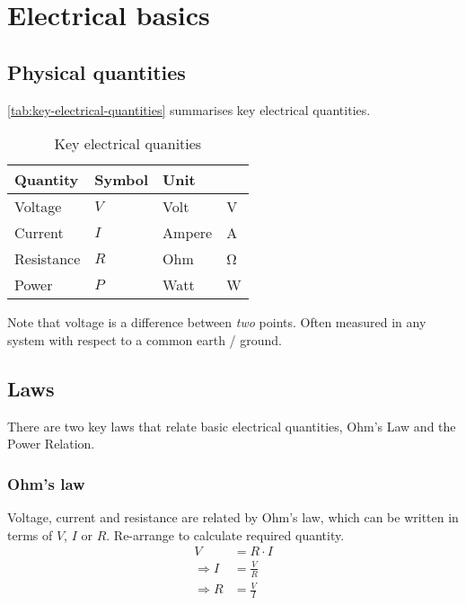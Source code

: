 \chapter{Electrical basics}
\label{ch:electrical-basics}


\section{Physical quantities}

\autoref{tab:key-electrical-quantities} summarises key electrical quantities.

\begin{table}[htbp]
  \centering
  \begin{tabular}{l l l l}
    \toprule
    \textbf{Quantity} & \textbf{Symbol} & \textbf{Unit} & ~ \\
    \midrule
    Voltage & $V$ & Volt & \si{\volt} \\
    Current & $I$ & Ampere & \si{\ampere} \\
    Resistance & $R$ & Ohm & \si{\ohm} \\
    Power & $P$ & Watt & \si{\watt} \\
    \bottomrule
  \end{tabular}
  \caption{Key electrical quanities}
  \label{tab:key-electrical-quantities}
\end{table}

Note that voltage is a difference between \textit{two} points.
Often measured in any system with respect to a common earth / ground.

\section{Laws}

There are two key laws that relate basic electrical quantities, Ohm's Law and the Power Relation.

\subsection{Ohm's law}
\label{sec:ohms-law}
  
Voltage, current and resistance are related by Ohm's law, which can be written in terms of $V$, $I$ or $R$.
Re-arrange to calculate required quantity.
\begin{align}
  V & = R \cdot I \\
  \Rightarrow I & = \frac{V}{R} \\
  \Rightarrow R & = \frac{V}{I}      
\end{align}

